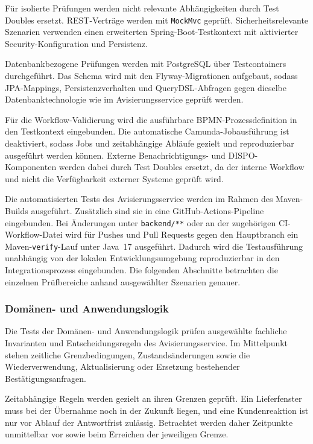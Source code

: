 \documentclass[
  12pt,
  a4paper,
  oneside
]{article}
\begin{document}
Für isolierte Prüfungen werden nicht relevante Abhängigkeiten durch Test
Doubles ersetzt. REST-Verträge werden mit \texttt{MockMvc} geprüft.
Sicherheitsrelevante Szenarien verwenden einen erweiterten
Spring-Boot-Testkontext mit aktivierter Security-Konfiguration und Persistenz.

Datenbankbezogene Prüfungen werden mit PostgreSQL über Testcontainers
durchgeführt. Das Schema wird mit den Flyway-Migrationen aufgebaut, sodass
JPA-Mappings, Persistenzverhalten und QueryDSL-Abfragen gegen dieselbe
Datenbanktechnologie wie im Avisierungsservice geprüft werden.

Für die Workflow-Validierung wird die ausführbare BPMN-Prozessdefinition in den
Testkontext eingebunden. Die automatische Camunda-Jobausführung ist deaktiviert,
sodass Jobs und zeitabhängige Abläufe gezielt und reproduzierbar ausgeführt
werden können. Externe Benachrichtigungs- und DISPO-Komponenten werden dabei
durch Test Doubles ersetzt, da der interne Workflow und nicht die Verfügbarkeit
externer Systeme geprüft wird.

Die automatisierten Tests des Avisierungsservice werden im Rahmen des
Maven-Builds ausgeführt. Zusätzlich sind sie in eine GitHub-Actions-Pipeline
eingebunden. Bei Änderungen unter \texttt{backend/**} oder an der zugehörigen
CI-Workflow-Datei wird für Pushes und Pull Requests gegen den Hauptbranch ein
Maven-\texttt{verify}-Lauf unter Java~17 ausgeführt. Dadurch wird die
Testausführung unabhängig von der lokalen Entwicklungsumgebung reproduzierbar
in den Integrationsprozess eingebunden. Die folgenden Abschnitte betrachten die
einzelnen Prüfbereiche anhand ausgewählter Szenarien genauer.

\subsubsection{Domänen- und Anwendungslogik}
\label{sec:test-domaenen-anwendungslogik}

Die Tests der Domänen- und Anwendungslogik prüfen ausgewählte fachliche
Invarianten und Entscheidungsregeln des Avisierungsservice. Im Mittelpunkt
stehen zeitliche Grenzbedingungen, Zustandsänderungen sowie die
Wiederverwendung, Aktualisierung oder Ersetzung bestehender
Bestätigungsanfragen.

Zeitabhängige Regeln werden gezielt an ihren Grenzen geprüft. Ein Lieferfenster
muss bei der Übernahme noch in der Zukunft liegen, und eine Kundenreaktion ist
nur vor Ablauf der Antwortfrist zulässig. Betrachtet werden daher Zeitpunkte
unmittelbar vor sowie beim Erreichen der jeweiligen Grenze.
\end{document}
